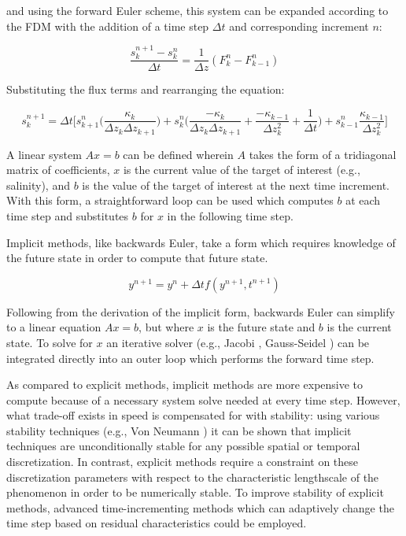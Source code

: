 \noindent and using the forward Euler scheme, this system can be expanded according to the FDM with the addition of a time step $\Delta t$ and corresponding increment $n$:

\begin{equation*}
	\frac{s_k^{n+1} - s_k^{n}}{\Delta t} = \frac{1}{\Delta z}(F_k^n - F_{k-1}^n)
\end{equation*}

Substituting the flux terms and rearranging the equation:

\begin{equation}
	s_k^{n+1} = \Delta t\Big[s_{k+1}^n\Big(\frac{\kappa_k}{\Delta z_k \Delta z_{k+1}}\Big) + s_k^n\Big(\frac{-\kappa_k}{\Delta z_k \Delta z_{k+1}}+\frac{-\kappa_{k-1}}{\Delta z_k^2} + \frac{1}{\Delta t}\Big) + s_{k-1}^n\frac{\kappa_{k-1}}{\Delta z_k^2}\Big]
\end{equation}

A linear system $Ax = b$ can be defined wherein $A$ takes the form of a tridiagonal matrix of coefficients, $x$ is the current value of the target of interest (e.g., salinity), and $b$ is the value of the target of interest at the next time increment. With this form, a straightforward loop can be used which computes $b$ at each time step and substitutes $b$ for $x$ in the following time step. 

Implicit methods, like backwards Euler, take a form which requires knowledge of the future state in order to compute that future state.

\begin{equation}
	y^{n+1} = y^n + \Delta t f(y^{n+1},t^{n+1})
\end{equation}
 
Following from the derivation of the implicit form, backwards Euler can simplify to a linear equation $Ax = b$, but where $x$ is the future state and $b$ is the current state. To solve for $x$ an iterative solver (e.g., Jacobi \autocite{forsythe1960cyclic}, Gauss-Seidel \autocite{usui1994adaptive}) can be integrated directly into an outer loop which performs the forward time step.

As compared to explicit methods, implicit methods are more expensive to compute because of a necessary system solve needed at every time step. However, what trade-off exists in speed is compensated for with stability: using various stability techniques (e.g., Von Neumann \autocite{wesseling1996neumann}) it can be shown that implicit techniques are unconditionally stable for any possible spatial or temporal discretization. In contrast, explicit methods require a constraint on these discretization parameters with respect to the characteristic lengthscale of the phenomenon in order to be numerically stable. To improve stability of explicit methods, advanced time-incrementing methods which can adaptively change the time step based on residual characteristics could be employed.

